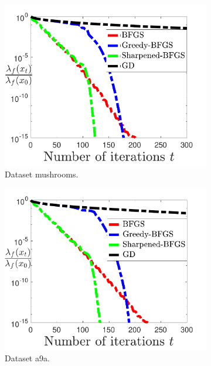 \documentclass[11pt]{article}
\numberwithin{assumption}{section}
\numberwithin{remark}{section}
\numberwithin{theorem}{section}
\begin{document}
\begin{figure}
\begin{subfigure}{0.32\textwidth}
    \includegraphics[width=\textwidth]{Figures/mushrooms.pdf}
    \caption{Dataset mushrooms.}
\end{subfigure}
\begin{subfigure}{0.32\textwidth}
    \includegraphics[width=\textwidth]{Figures/a9a.pdf}
    \caption{Dataset a9a.}
\end{subfigure}
\hfill
\begin{subfigure}{0.32\textwidth}

\end{subfigure}
\end{figure}
\end{document}
